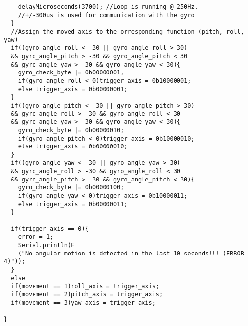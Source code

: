 \begin{lstlisting}
    delayMicroseconds(3700); //Loop is running @ 250Hz.
    //+/-300us is used for communication with the gyro
  }
  //Assign the moved axis to the orresponding function (pitch, roll, yaw)
  if((gyro_angle_roll < -30 || gyro_angle_roll > 30) 
  && gyro_angle_pitch > -30 && gyro_angle_pitch < 30 
  && gyro_angle_yaw > -30 && gyro_angle_yaw < 30){
    gyro_check_byte |= 0b00000001;
    if(gyro_angle_roll < 0)trigger_axis = 0b10000001;
    else trigger_axis = 0b00000001;
  }
  if((gyro_angle_pitch < -30 || gyro_angle_pitch > 30) 
  && gyro_angle_roll > -30 && gyro_angle_roll < 30 
  && gyro_angle_yaw > -30 && gyro_angle_yaw < 30){
    gyro_check_byte |= 0b00000010;
    if(gyro_angle_pitch < 0)trigger_axis = 0b10000010;
    else trigger_axis = 0b00000010;
  }
  if((gyro_angle_yaw < -30 || gyro_angle_yaw > 30) 
  && gyro_angle_roll > -30 && gyro_angle_roll < 30 
  && gyro_angle_pitch > -30 && gyro_angle_pitch < 30){
    gyro_check_byte |= 0b00000100;
    if(gyro_angle_yaw < 0)trigger_axis = 0b10000011;
    else trigger_axis = 0b00000011;
  }
  
  if(trigger_axis == 0){
    error = 1;
    Serial.println(F
    ("No angular motion is detected in the last 10 seconds!!! (ERROR 4)"));
  }
  else
  if(movement == 1)roll_axis = trigger_axis;
  if(movement == 2)pitch_axis = trigger_axis;
  if(movement == 3)yaw_axis = trigger_axis;
  
}


\end{lstlisting}
